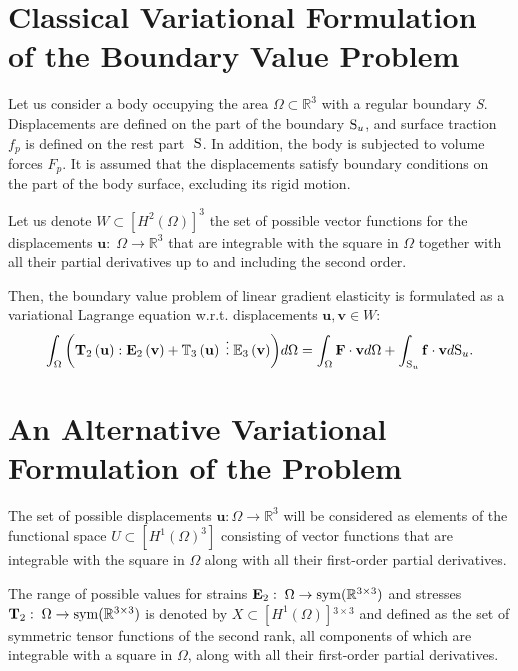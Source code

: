 \section{Classical Variational Formulation of the Boundary Value  Problem}

Let us consider a body occupying the area $\Omega \subset {{\mathbb R}}^3$ with a regular boundary \textit{S}. Displacements are defined on the part of the boundary ${{\rm S}}_u$, and surface traction $f_p$ is defined on the rest part ${\ {\rm S}}$. In addition, the body is subjected to volume forces $F_p$. It is assumed that the displacements satisfy boundary conditions on the part of the body surface, excluding its rigid motion.

Let us denote $W\subset [H^2(\Omega )]^3$ the set of possible vector functions for the displacements ${\mathbf u}:\;\Omega \to {{\mathbb R}}^3$ that are integrable with the square in $\Omega $ together with all their partial derivatives up to and including the second order.

Then, the boundary value problem of linear gradient elasticity is formulated as a variational Lagrange equation w.r.t. displacements ${\mathbf u},{\mathbf v}\in W$:   
\begin{equation} \label{Chirkov_Eq_17_} 
	\int_{\Omega }{\left({{\mathbf T}}_2\left({\mathbf u}\right):{{\mathbf E}}_2\left({\mathbf v}\right)+{{\mathbb T}}_3\left({\mathbf u}\right)\;\vdots\; {{\mathbb E}}_3\left({\mathbf v}\right)\right)}d\Omega =\int_{\Omega }{{\mathbf F}\cdot {\mathbf v}d\Omega }+\int_{{{\rm S}}_u}{{\mathbf f}\cdot {\mathbf v}d{{\rm S}}_u}. 
\end{equation} 


\section{An Alternative Variational Formulation of the Problem }

The set of possible displacements ${\mathbf u}:\Omega \to {{\mathbb R}}^3$ will be considered as elements of the functional space $U\subset [H^1(\Omega)^3]$ consisting of vector functions that are integrable with the square in $\Omega $ along with all their first-order partial derivatives. 

The range of possible values for strains ${{\mathbf E}}_2:\;\Omega \to {\rm sym}({\mathbb R}^{3\times 3})$ and stresses ${{\mathbf T}}_2:\;\Omega \to{\rm sym}({{\mathbb R}}{}^{3\times 3})$ is denoted by $X\subset [H^1(\Omega )]{}^{3\times 3}$ and defined as the set of symmetric tensor functions of the second rank, all components of which are integrable with a square in $\Omega $, along with all their first-order partial derivatives. 

